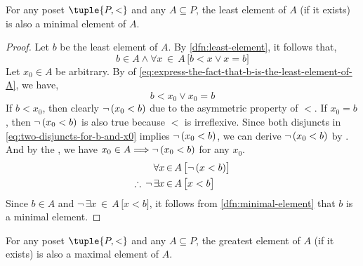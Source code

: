 \begin{thm}
    \label{thm:least-element-is-also-a-minimal-element}
    For any poset \( \tuple{P, <} \) and any \( A \subseteq P \), the least element of \( A \) (if it exists) is also a
    minimal element of \( A \).
\end{thm}

\begin{proof}
    Let \( b \) be the least element of \( A \). By \cref{dfn:least-element}, it follows that,
    \begin{equation}
        \label{eq:express-the-fact-that-b-is-the-least-element-of-A}
        b \in A \land \forall x\,{\in}\,A \, \big[ b < x \lor x = b \big]
    \end{equation}
    Let \( x_{0} \in A \) be arbitrary. By  of \eqref{eq:express-the-fact-that-b-is-the-least-element-of-A},
    we have,
    \begin{equation}
        \label{eq:two-disjuncts-for-b-and-x0}
        b < x_{0} \lor x_{0} = b
    \end{equation}
    If \( b < x_{0} \), then clearly \( \lnot \, \mleft( x_{0} < b \mright) \) due to the asymmetric property of \( < \).
    If \( x_{0} = b \), then \( \lnot \, \mleft( x_{0} < b \mright) \) is also true because \( < \) is irreflexive. Since
    both disjuncts in \eqref{eq:two-disjuncts-for-b-and-x0} implies \( \lnot \, \mleft( x_{0} < b \mright) \), we can derive
    \( \lnot \, \mleft( x_{0} < b \mright) \) by .
    And by the , we have \( x_{0} \in A {\implies} \lnot \, \mleft( x_{0} < b \mright) \) for any \( x_{0} \).
    \begin{align*}
        &\forall x\,{\in}\,A \, \big[ \lnot \, \mleft( x < b \mright) \big]\\
        \therefore \, \lnot \, &\exists x\,{\in}\,A \, \big[ x < b \big]
    \end{align*}
    Since \( b \in A \) and \( \lnot \, \exists x\,{\in}\,A \, \big[ x < b \big] \),
    it follows from \cref{dfn:minimal-element} that \( b \) is a minimal element.
\end{proof}

\begin{thm}
    \label{thm:greatest-element-is-also-a-maximal-element}
    For any poset \( \tuple{P, <} \) and any \( A \subseteq P \), the greatest element of \( A \) (if it exists) is also a
    maximal element of \( A \).
\end{thm}

